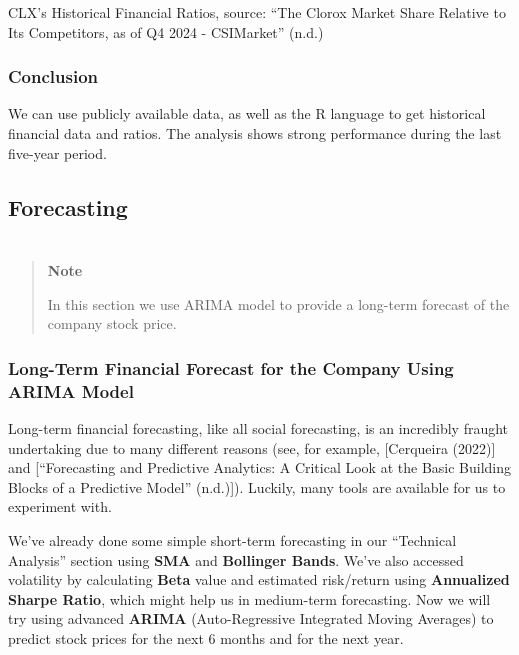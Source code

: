 \documentclass[
  letterpaper,
  DIV=11,
  numbers=noendperiod]{scrartcl}
\begin{document}
CLX's Historical Financial Ratios, source: {``The {Clorox Market} Share
Relative to Its Competitors, as of {Q4} 2024 - {CSIMarket}''} (n.d.)

\subsubsection{Conclusion}\label{conclusion-4}

We can use publicly available data, as well as the R language to get
historical financial data and ratios. The analysis shows strong
performance during the last five-year period.

\subsection{Forecasting}\label{forecasting}

\section{}\label{section-6}

\begin{quote}
\textbf{Note}

In this section we use ARIMA model to provide a long-term forecast of
the company stock price.
\end{quote}

\subsubsection{\texorpdfstring{\textbf{Long-Term Financial Forecast for
the Company Using ARIMA
Model}}{Long-Term Financial Forecast for the Company Using ARIMA Model}}\label{long-term-financial-forecast-for-the-company-using-arima-model}

Long-term financial forecasting, like all social forecasting, is an
incredibly fraught undertaking due to many different reasons (see, for
example, {[}Cerqueira (2022){]} and {[}{``Forecasting and Predictive
Analytics: {A} Critical Look at the Basic Building Blocks of a
Predictive Model''} (n.d.){]}). Luckily, many tools are available for us
to experiment with.

We've already done some simple short-term forecasting in our ``Technical
Analysis'' section using \textbf{SMA} and \textbf{Bollinger Bands}.
We've also accessed volatility by calculating \textbf{Beta} value and
estimated risk/return using \textbf{Annualized Sharpe Ratio}, which
might help us in medium-term forecasting. Now we will try using advanced
\textbf{ARIMA} (Auto-Regressive Integrated Moving Averages) to predict
stock prices for the next 6 months and for the next year.
\end{document}
